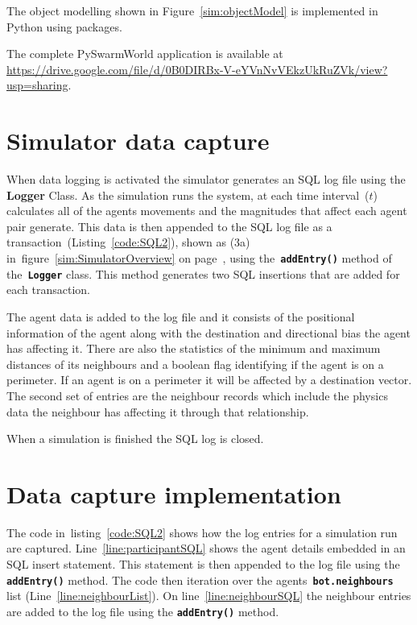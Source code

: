The object modelling shown in Figure~\ref{sim:objectModel} is implemented in Python using packages.

The complete PySwarmWorld application is available at \url{https://drive.google.com/file/d/0B0DIRBx-V-eYVnNvVEkzUkRuZVk/view?usp=sharing}.

\section{Simulator data capture}\label{sim:DataAnalysis}
When data logging is activated the simulator generates an SQL log file using the \textbf{Logger} Class. As the simulation runs the system, at each time interval~($t$) calculates all of the agents movements and the magnitudes that affect each agent pair generate. This data is then appended to the SQL log file as a transaction~(Listing~\ref{code:SQL2}), shown as (3a) in~figure~\ref{sim:SimulatorOverview} on page~\pageref{sim:SimulatorOverview}, using the~\texttt{\textbf{addEntry()}} method of the~\texttt{\textbf{Logger}} class. This method generates two SQL insertions that are added for each transaction. 

The agent data is added to the log file and it consists of the positional information of the agent along with the destination and directional bias the agent has affecting it. There are also the statistics of the minimum and maximum distances of its neighbours and a boolean flag identifying if the agent is on a perimeter. If an agent is on a perimeter it will be affected by a destination vector. The second set of entries are the neighbour records which include the physics data the neighbour has affecting it through that relationship. 

When a simulation is finished the SQL log is closed. 

\section{Data capture implementation}
The code in~listing~\ref{code:SQL2} shows how the log entries for a simulation run are captured. Line~\ref{line:participantSQL} shows the agent details embedded in an SQL insert statement. This statement is then appended to the log file using the \texttt{\textbf{addEntry()}} method. The code then iteration over the agents~\texttt{\textbf{bot.neighbours}} list (Line~\ref{line:neighbourList}). On line~\ref{line:neighbourSQL} the neighbour entries are added to the log file using the \texttt{\textbf{addEntry()}} method.

